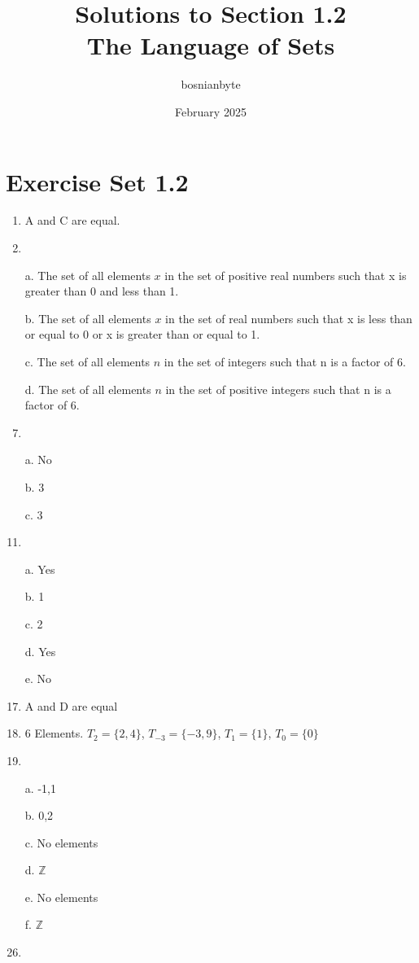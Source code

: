 \documentclass{article}
\title{Solutions to Section 1.2 \\ The Language of Sets}
\author{bosnianbyte}
\date{February 2025}
\begin{document}
\maketitle

\section{Exercise Set 1.2}

\begin{enumerate}[label=\textbf{\arabic*.}]
\item %
A and C are equal.
\item %
\item[a.] The set of all elements $x$ in the set of positive real numbers such that x is greater than 0 and less than 1.
\item[b.] The set of all elements $x$ in the set of real numbers such that x is less than or equal to 0 or x is greater than or equal to 1.
\item[c.] The set of all elements $n$ in the set of integers such that n is a factor of 6.
\item[d.] The set of all elements $n$ in the set of positive integers such that n is a factor of 6.
\item %
\item[a.] No
\item[b.] 3
\item[c.] 3
\item %
\item[a.] Yes
\item[b.] 1
\item[c.] 2
\item[d.] Yes
\item[e.] No
\item %
A and D are equal
\item %
6 Elements. $T_2 = \{2, 4\}$, $T_{-3} = \{-3, 9\}$, $T_1 = \{1\}$, $T_0 = \{0\}$
\item %
\item[a.] {-1,1}
\item[b.] {0,2}
\item[c.] No elements
\item[d.] $\mathbb{Z}$ 
\item[e.] No elements
\item[f.] $\mathbb{Z}$
\item %

\end{enumerate}
\end{document}
